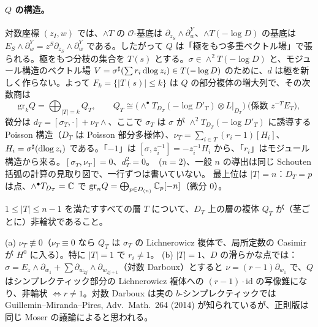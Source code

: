 \paragraph{$Q$ の構造。}
対数座標 $(z_I,w)$ では、$\wedge T$ の $\mathcal O$-基底は $\partial_{z_S}\wedge\partial_w^Y$、$\wedge T(-\log D)$ の基底は $E_S\wedge\partial_w^Y=z^S\partial_{z_S}\wedge\partial_w^Y$ である。したがって $Q$ は「極をもつ多重ベクトル場」で張られる。極をもつ分枝の集合を $T(s)$ とする。$\sigma\in\wedge^2T(-\log D)$ と、モジュール構造のベクトル場 $V=\sigma^\sharp(\sum r_i\,\mathrm{dlog}\, z_i)\in T(-\log D)$ のために、$d$ は極を新しく作らない。よって $F_k=\{|T(s)|\le k\}$ は $Q$ の部分複体の増大列で、その次数商は
\[\mathrm{gr}_kQ=\bigoplus_{|T|=k}Q_T,\qquad Q_T\cong\bigl(\wedge^\bullet T_{D_T}(-\log D'_T)\otimes L|_{D_T}\bigr)\ \text{(係数 }z^{-T}E_T\text{)},\]
微分は $d_T=[\sigma_T,\cdot]+\nu_T\wedge$、ここで $\sigma_T$ は $\sigma$ が $\wedge^2T_{D_T}(-\log D'_T)$ に誘導する Poisson 構造（$D_T$ は Poisson 部分多様体）、$\nu_T=\sum_{i\in T}(r_i-1)[H_i]$、$H_i=\sigma^\sharp(\mathrm{dlog}\, z_i)$ である。「$-1$」は $[\sigma,z_i^{-1}]=-z_i^{-1}H_i$ から、「$r_i$」はモジュール構造から来る。$[\sigma_T,\nu_T]=0$、$d_T^2=0$。\tP\ ($n=2$)、一般 $n$ の導出は同じ Schouten 括弧の計算の見取り図で、一行ずつは書いていない\tQ。
最上位は $|T|=n$：$D_T=p$ は点、$\wedge^\bullet T_{D_T}=\mathbb C$ で $\mathrm{gr}_nQ=\bigoplus_{p\in D_{(n)}}\mathbb C_p[-n]$（微分 0）。\tP

\begin{defn}[(GEN$'$)]\label{p4:def:GEN}
$1\le|T|\le n-1$ を満たすすべての層 $T$ について、$D_T$ 上の層の複体 $Q_T$ が（茎ごとに）非輪状であること。
\end{defn}
\begin{prop}\tP\label{p4:prop:genNec}
(a) $\nu_T\not\equiv0$（$\nu_T\equiv0$ なら $Q_T$ は $\sigma_T$ の Lichnerowicz 複体で、局所定数の Casimir が $H^0$ に入る）。特に $|T|=1$ で $r_i\neq1$。
(b) $|T|=1$、$D$ の滑らかな点では：$\sigma=E_z\wedge\partial_{w_1}+\sum\partial_{w_{2j}}\wedge\partial_{w_{2j+1}}$（対数 Darboux）とすると $\nu=(r-1)\partial_{w_1}$ で、$Q$ はシンプレクティック部分の Lichnerowicz 複体への $(r-1)\cdot\mathrm{id}$ の写像錐になり、非輪状 $\iff r\neq1$。対数 Darboux は実の $b$-シンプレクティックでは Guillemin--Miranda--Pires, Adv.\ Math.\ 264 (2014) が知られているが、正則版は同じ Moser の議論によると思われる\tQ。
\end{prop}

